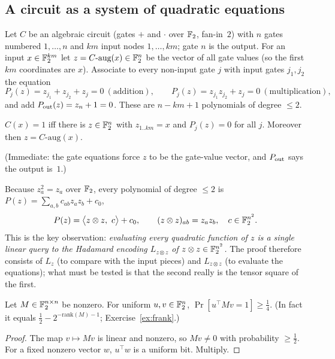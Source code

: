 \subsection{A circuit as a system of quadratic equations}

Let $C$ be an algebraic circuit (gates $+$ and $\cdot$ over $\mathbb{F}_2$, fan-in~$2$) with $n$ gates numbered $1,\dots,n$ and $km$ input nodes $1,\dots,km$; gate $n$ is the output.  For an input $x\in\mathbb{F}_2^{km}$ let
$z=C\text{-aug}(x)\in\mathbb{F}_2^n$ be the vector of all gate values (so the first $km$ coordinates are $x$).  Associate to every non-input gate $j$ with input gates $j_1,j_2$ the equation
\[
  P_j(z)=z_{j_1}+z_{j_2}+z_j=0\ (\text{addition}),\qquad P_j(z)=z_{j_1}z_{j_2}+z_j=0\ (\text{multiplication}),
\]
and add $P_{\rm out}(z)=z_n+1=0$.  These are $n-km+1$ polynomials of degree $\le2$.

\begin{lemma}\label{lem:aug}
$C(x)=1$ iff there is $z\in\mathbb{F}_2^n$ with $z_{1..km}=x$ and $P_j(z)=0$ for all $j$.  Moreover then $z=C\text{-aug}(x)$.
\end{lemma}
\noindent(Immediate: the gate equations force $z$ to be the gate-value vector, and $P_{\rm out}$ says the output is~$1$.)

Because $z_a^2=z_a$ over $\mathbb{F}_2$, every polynomial of degree $\le2$ is $P(z)=\sum_{a,b}c_{ab}z_az_b+c_0$, \ie
\begin{equation}\label{eq:quad}
  P(z)=\bigl\langle z\otimes z,\ c\bigr\rangle+c_0,\qquad(z\otimes z)_{ab}=z_az_b,\quad c\in\mathbb{F}_2^{n^2}.
\end{equation}
This is the key observation: \emph{evaluating every quadratic function of $z$ is a single linear query to the Hadamard encoding $L_{z\otimes z}$ of $z\otimes z\in\mathbb{F}_2^{n^2}$.}
The proof therefore consists of $L_z$ (to compare with the input pieces) and $L_{z\otimes z}$ (to evaluate the equations); what must be tested is that the second really is the tensor square of the first.

\begin{lemma}\label{lem:freivalds}
Let $M\in\mathbb{F}_2^{n\times n}$ be nonzero.  For uniform $u,v\in\mathbb{F}_2^n$, $\Pr[u^{\top}Mv=1]\ge\tfrac14$.  (In fact it equals $\tfrac12-2^{-\mathrm{rank}(M)-1}$; Exercise~\ref{ex:frank}.)
\end{lemma}
\begin{proof}
The map $v\mapsto Mv$ is linear and nonzero, so $Mv\ne0$ with probability $\ge\tfrac12$.  For a fixed nonzero vector $w$, $u^\top w$ is a uniform bit.  Multiply.
\end{proof}

